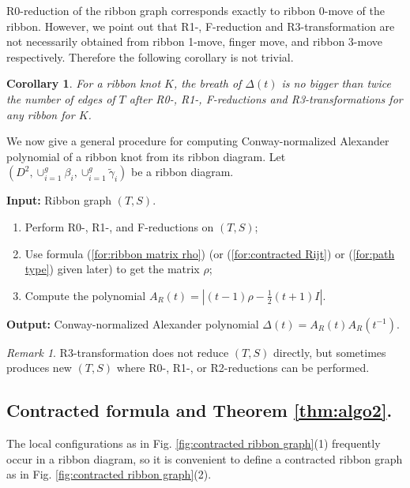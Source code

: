 \documentclass{amsart}
\newtheorem{cor}[thm]{Corollary}
\theoremstyle{definition}
\theoremstyle{remark}
\newtheorem{rem}[thm]{Remark}
\numberwithin{equation}{subsection}
\begin{document}
R0-reduction of the ribbon graph corresponds exactly to ribbon 0-move of the ribbon. However, we point out that R1-, F-reduction and R3-transformation are not necessarily obtained from ribbon 1-move, finger move, and ribbon 3-move respectively. Therefore the following corollary is not trivial.

\begin{cor}\label{cor:breath}
For a ribbon knot $K$, the breath of $\Delta(t)$ is no bigger than twice the number of edges of $T$ after R0-, R1-, F-reductions and R3-transformations for any ribbon for $K$.
\end{cor}

We now give a general procedure for computing Conway-normalized Alexander polynomial of a ribbon knot from its ribbon diagram. Let $(D^{2},\cup_{i=1}^{g}\beta_{i},\cup_{i=1}^{g}\tilde{\gamma}_{i})$ be a ribbon diagram.

\textbf{Input:} Ribbon graph $(T,S)$.

\begin{enumerate}
    \item Perform R0-, R1-, and F-reductions on $(T,S)$;
    \item Use formula (\ref{for:ribbon matrix rho}) (or (\ref{for:contracted Rijt}) or (\ref{for:path type}) given later) to get the matrix $\rho$;
    \item Compute the polynomial $A_{R}(t)=|(t-1)\rho-\frac{1}{2}(t+1)I|$.
\end{enumerate}

\textbf{Output:} Conway-normalized Alexander polynomial $\Delta(t)=A_{R}(t)A_{R}(t^{-1})$.

\begin{rem}
R3-transformation does not reduce $(T,S)$ directly, but sometimes produces new $(T,S)$ where R0-, R1-, or R2-reductions can be performed.
\end{rem}


\subsection{Contracted formula and Theorem \ref{thm:algo2}.}\label{subsect:Contracted formula}
The local configurations as in Fig. \ref{fig:contracted ribbon graph}(1) frequently occur in a ribbon diagram, so it is convenient to define a contracted ribbon graph as in Fig. \ref{fig:contracted ribbon graph}(2).
\end{document}
